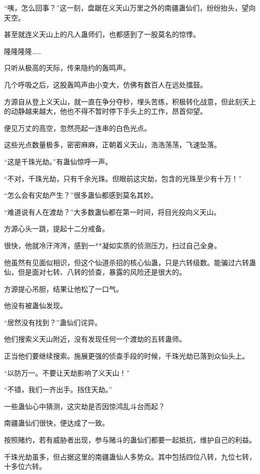 
\begin{this_body}

“咦，怎么回事？”这一刻，盘踞在义天山万里之外的南疆蛊仙们，纷纷抬头，望向天空。

甚至就连义天山上的凡人蛊师们，也都感到了一股莫名的惊悸。

隆隆隆隆……

只听从极高的天际，传来隐约的轰鸣声。

几个呼吸之后，这股轰鸣声由小变大，仿佛有数百人在远处擂鼓。

方源自从登上义天山，就一直在争分夺秒，埋头苦练，积极转化战意，但此刻天上的动静越来越大，他也不得不暂时停下手头上的工作，昂首仰望。

便见万丈的高空，忽然亮起一连串的白色光点。

这些光点数量极多，密密麻麻，正朝着义天山，浩浩荡荡，飞速坠落。

“这是千珠光劫。”有蛊仙惊呼一声。

“不对，千珠光劫，只有千余光珠。但眼前这灾劫，包含的光珠至少有十万！”

“怎么会有灾劫产生？”很多蛊仙都感到莫名其妙。

“难道说有人在渡劫？”大多数蛊仙都在第一时间，将目光投向义天山。

方源心头一跳，提起十二分戒备。

很快，他就冷汗涔涔，感到一**凝如实质的侦测压力，扫过自己全身。

他虽然有见面似相识，但这个仙道杀招的核心仙蛊，只是六转级数。能骗过六转蛊仙，但是面对七转、八转的侦查，暴露的风险还是很大的。

方源提心吊胆，结果让他松了一口气。

他没有被蛊仙发现。

“居然没有找到？”蛊仙们诧异。

他们搜索义天山附近，没有发现任何一个渡劫的五转蛊师。

正当他们要继续搜索。施展更强的侦查手段的时候，千珠光劫已落到众仙头上。

“以防万一。不要让天劫影响了义天山！”

“不错，我们一齐出手。挡住天劫。”

一些蛊仙心中猜测，这灾劫是否因惊鸿乱斗台而起？

南疆蛊仙们很快，便达成了一致。

按照赌约，若有威胁者出现，参与赌斗的蛊仙们都要一起抵抗，维护自己的利益。

千珠光劫虽多，但占据这里的南疆蛊仙人多势众。其中包括四位八转，九位七转，十多位六转。


\end{this_body}
